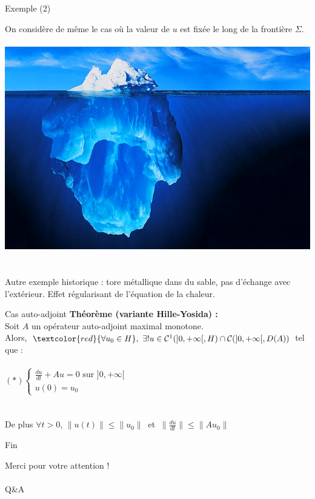 \documentclass[10pt]{beamer}
\begin{document}
\begin{frame}{Exemple (2)}

On considère de même le cas où la valeur de $u$ est fixée le long de la frontière $\Sigma$. \\~\\


\includegraphics[scale=0.25]{iceberg.png}
 ~ \\~\\

Autre exemple historique : tore métallique dans du sable, pas d'échange avec l'extérieur. Effet régularisant de l'équation de la chaleur.
\end{frame}


\begin{frame}{Cas auto-adjoint}
\textbf{Théorème (variante Hille-Yosida) : \\}
Soit $A$ un opérateur auto-adjoint maximal monotone.\\
 Alors, $\textcolor{red}{\forall  u_0 \in H}, \ \exists ! u \in \mathcal{C}^1(]0,+\infty[,H) \cap\mathcal{C}(]0,+\infty[,D(A)) $ tel que : \\ ~ \\
$(*) \begin{cases}\displaystyle \frac{du}{dt} +Au = 0 \text{\ \ \ \ sur } ]0,+\infty[ \\ u(0)=u_0 \end{cases}$ \\ ~ \\ ~ \\
De plus  $\forall t > 0$, $\|u(t)\|\leq \|u_0\| \ $ et $\ \displaystyle \|\frac{du}{dt}\| \leq  \|Au_0\|$
\end{frame}


\begin{frame}{Fin}

\begin{center}
Merci pour votre attention ! \\~\\
Q\&A
\end{center}

\end{frame}
\end{document}
